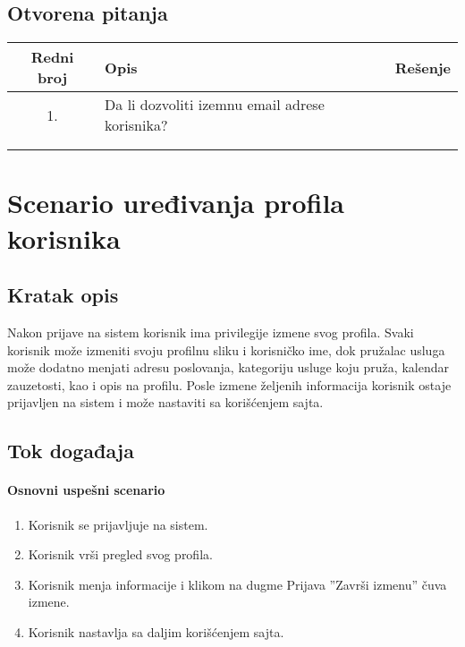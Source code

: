 \documentclass[a4paper,12pt]{report}
\newcommand{\dativfunkcionalnosti}{uređivanja profila korisnika}
\begin{document}
\subsection{Otvorena pitanja}
    \begin{center}
    \begin{tabular}{ |c|p{10cm}|l| }
    \hline
    \textbf{Redni broj} & \hspace{4cm} \textbf{Opis} & \textbf{Rešenje} \\ 
    \hline
     1. & Da li dozvoliti izemnu email adrese korisnika? & \\
     \hline
      & &   \\
     \hline
     & &   \\
     \hline
    \end{tabular}
    \end{center}
\section{Scenario \dativfunkcionalnosti}
\subsection{Kratak opis}
    Nakon prijave na sistem korisnik ima privilegije izmene svog profila. Svaki korisnik može izmeniti svoju profilnu sliku i korisničko ime, dok pružalac usluga može dodatno menjati adresu poslovanja, kategoriju usluge koju pruža, kalendar zauzetosti, kao i opis na profilu. Posle izmene željenih informacija korisnik ostaje prijavljen na sistem i može nastaviti sa korišćenjem sajta.

\subsection{Tok događaja}
    \paragraph*{Osnovni uspešni scenario}
    \begin{enumerate}
        \item Korisnik se prijavljuje na sistem.
        \item Korisnik vrši pregled svog profila.
        \item Korisnik menja informacije i klikom na dugme Prijava ''Završi izmenu'' čuva izmene. 
        \item Korisnik nastavlja sa daljim korišćenjem sajta.
    \end{enumerate}
    
\end{document}
